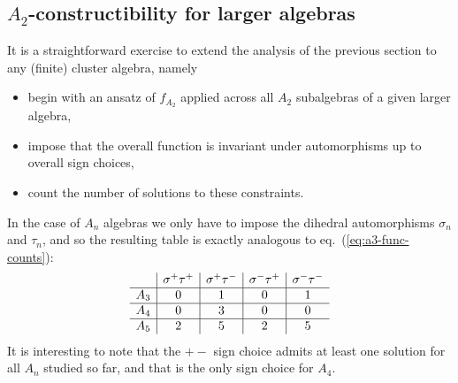 \documentclass[11pt]{article}
\def\pdfeq#1{\texorpdfstring{$#1$}{a}}
\begin{document}
\subsection{\pdfeq{A_2}-constructibility for larger algebras}\label{sec:a2-constructibility}

It is a straightforward exercise to extend the analysis of the previous section to any (finite) cluster algebra, namely
\begin{itemize}
	\item begin with an ansatz of $f_{A_2}$ applied across all $A_2$ subalgebras of a given larger algebra,
	\item impose that the overall function is invariant under automorphisms up to overall sign choices,
	\item count the number of solutions to these constraints.
\end{itemize}

In the case of $A_n$ algebras we only have to impose the dihedral automorphisms $\sigma_n$ and $\tau_n$, and so the resulting table is exactly analogous to eq.~(\ref{eq:a3-func-counts}):
\begin{equation}\label{eq:an-func-counts}
\begin{array}{ l | c | c | c | c }			
  & \sigma^+\tau^+ & \sigma^+\tau^- & \sigma^-\tau^+ & \sigma^-\tau^- \\
  \hline
  A_3 & 0 & 1 & 0 & 1 \\  
  \hline
  A_4 & 0 & 3 & 0 & 0 \\
  \hline
  A_5 & 2 & 5 & 2 & 5 
\end{array} 
\end{equation}
It is interesting to note that the $+-$ sign choice admits at least one solution for all $A_n$ studied so far, and that is the only sign choice for $A_4$. 
\end{document}
